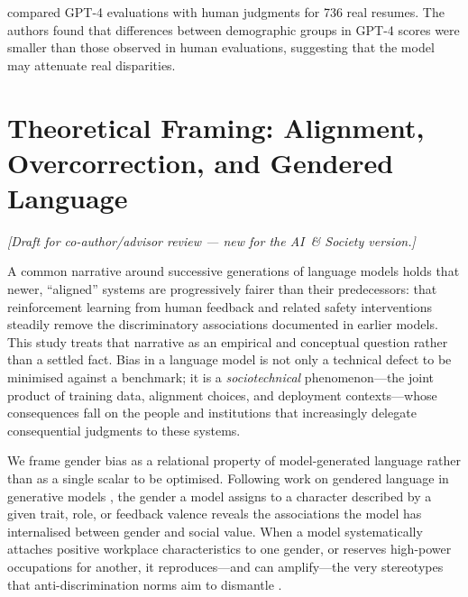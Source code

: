 \documentclass[12pt,a4paper]{article}
\begin{document}
\citet{vaishampayan2025} compared GPT-4 evaluations with
human judgments for 736 real resumes. The authors found
that differences between demographic groups in GPT-4 scores were
smaller than those observed in human evaluations, suggesting that the model
may attenuate real disparities.


\section{Theoretical Framing: Alignment, Overcorrection, and Gendered Language}
\label{sec:framing}

\noindent\emph{[Draft for co-author/advisor review --- new for the AI~\& Society version.]}

A common narrative around successive generations of language models holds that
newer, ``aligned'' systems are progressively fairer than their predecessors: that
reinforcement learning from human feedback and related safety interventions steadily
remove the discriminatory associations documented in earlier models. This study treats
that narrative as an empirical and conceptual question rather than a settled fact. Bias
in a language model is not only a technical defect to be minimised against a benchmark;
it is a \emph{sociotechnical} phenomenon---the joint product of training data, alignment
choices, and deployment contexts---whose consequences fall on the people and institutions
that increasingly delegate consequential judgments to these systems.

We frame gender bias as a relational property of model-generated language rather than as
a single scalar to be optimised. Following work on gendered language in generative models
\citep{lucy2021}, the gender a model assigns to a character described by a given trait,
role, or feedback valence reveals the associations the model has internalised between
gender and social value. When a model systematically attaches positive workplace
characteristics to one gender, or reserves high-power occupations for another, it
reproduces---and can amplify---the very stereotypes that anti-discrimination norms aim to
dismantle \citep{obermeyer2019}.
\end{document}
